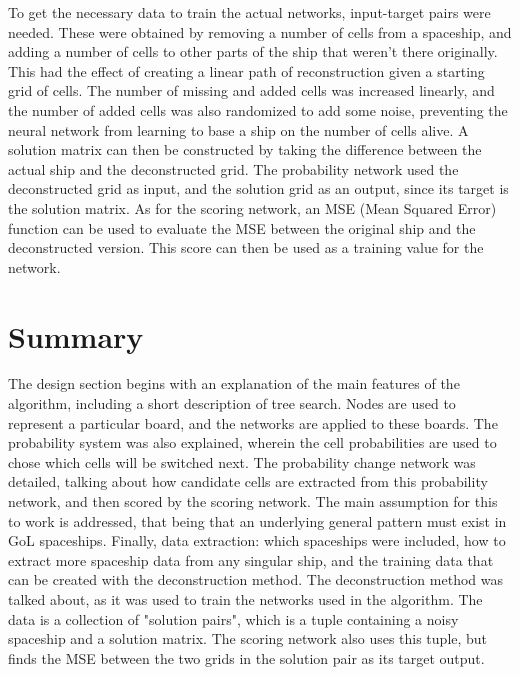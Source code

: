 \documentclass{l4proj}
\begin{document}
To get the necessary data to train the actual networks, input-target pairs were needed. These were obtained by removing a number of cells from a spaceship, and adding a number of cells to other parts of the ship that weren't there originally. This had the effect of creating a linear path of reconstruction given a starting grid of cells. The number of missing and added cells was increased linearly, and the number of added cells was also randomized to add some noise, preventing the neural network from learning to base a ship on the number of cells alive. A solution matrix can then be constructed by taking the difference between the actual ship and the deconstructed grid. The probability network used the deconstructed grid as input, and the solution grid as an output, since its target is the solution matrix. As for the scoring network, an MSE (Mean Squared Error) function can be used to evaluate the MSE between the original ship and the deconstructed version. This score can then be used as a training value for the network. 

\section{Summary}

The design section begins with an explanation of the main features of the algorithm, including a short description of tree search. Nodes are used to represent a particular board, and the networks are applied to these boards. The probability system was also explained, wherein the cell probabilities are used to chose which cells will be switched next. The probability change network was detailed, talking about how candidate cells are extracted from this probability network, and then scored by the scoring network. The main assumption for this to work is addressed, that being that an underlying general pattern must exist in GoL spaceships. Finally, data extraction: which spaceships were included, how to extract more spaceship data from any singular ship, and the training data that can be created with the deconstruction method. The deconstruction method was talked about, as it was used to train the networks used in the algorithm. The data is a collection of "solution pairs", which is a tuple containing a noisy spaceship and a solution matrix. The scoring network also uses this tuple, but finds the MSE between the two grids in the solution pair as its target output.


\end{document}
